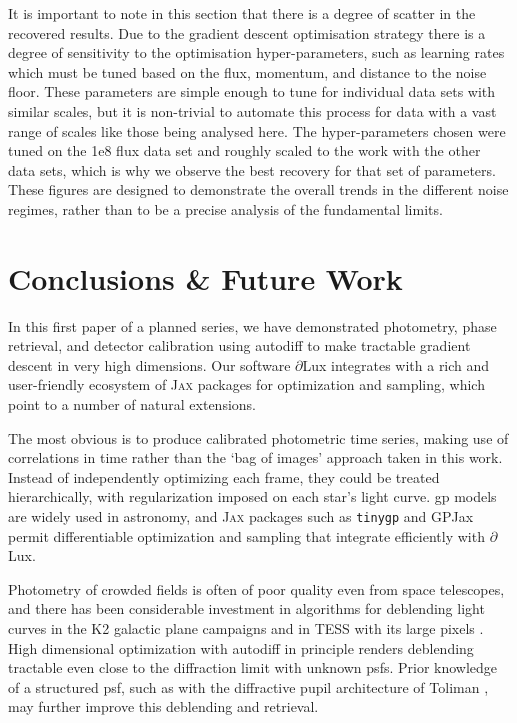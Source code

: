 \documentclass[]{spieman}
\newcommand\jax{\textsc{Jax}\xspace}
\newcommand\dlux{$\partial$Lux\xspace}
\begin{document}
It is important to note in this section that there is a degree of scatter in the recovered results. Due to the gradient descent optimisation strategy there is a degree of sensitivity to the optimisation hyper-parameters, such as learning rates which must be tuned based on the flux, momentum, and distance to the noise floor. These parameters are simple enough to tune for individual data sets with similar scales, but it is non-trivial to automate this process for data with a vast range of scales like those being analysed here. The hyper-parameters chosen were tuned on the 1e8 flux data set and roughly scaled to the work with the other data sets, which is why we observe the best recovery for that set of parameters. These figures are designed to demonstrate the overall trends in the different noise regimes, rather than to be a precise analysis of the fundamental limits.

\section{Conclusions \& Future Work}
In this first paper of a planned series, we have demonstrated photometry, phase retrieval, and detector calibration using autodiff to make tractable gradient descent in very high dimensions. Our software \dlux integrates with a rich and user-friendly ecosystem of \jax packages for optimization and sampling, which point to a number of natural extensions.

The most obvious is to produce calibrated photometric time series, making use of correlations in time rather than the `bag of images' approach taken in this work. Instead of independently optimizing each frame, they could be treated hierarchically, with regularization imposed on each star's light curve. \ac{gp} models are widely used in astronomy, and \jax packages such as \texttt{tinygp} \cite{Aigrain2022} and GPJax \cite{Pinder2022} permit differentiable optimization and sampling that integrate efficiently with \dlux. 

Photometry of crowded fields is often of poor quality even from space telescopes, and there has been considerable investment in algorithms for deblending light curves in the K2 galactic plane campaigns \cite{Zhu2017} and in TESS with its large pixels \cite{Nardiello2019,Hedges2021,Higgins2022}. High dimensional optimization with autodiff in principle renders deblending tractable even close to the diffraction limit with unknown \ac{psf}s. Prior knowledge of a structured \ac{psf}, such as with the diffractive pupil architecture of Toliman \cite{Guyon2012,Guyon2013}, may further improve this deblending and retrieval. 
\end{document}
